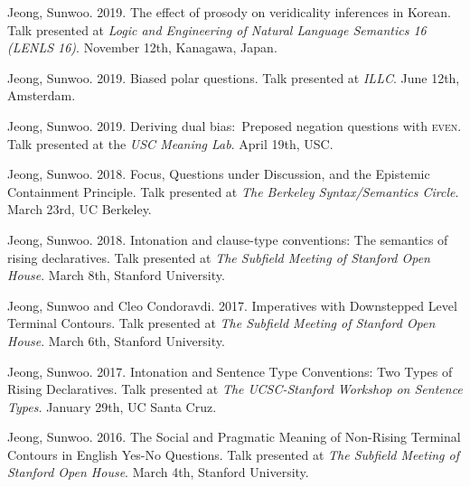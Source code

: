 \documentclass[letterpaper]{article}
\renewenvironment{itemize}{
  \begin{list}{}{
    \setlength{\leftmargin}{1.5em}
  }
}{
  \end{list}
}
\begin{document}
\begin{itemize}


\item Jeong, Sunwoo. 2019. The effect of prosody on veridicality inferences in Korean. Talk presented at \emph{Logic and Engineering of Natural Language Semantics 16 (LENLS 16)}. November 12th, Kanagawa, Japan.

\item Jeong, Sunwoo. 2019. Biased polar questions. Talk presented at \emph{ILLC}. June 12th, Amsterdam.

\item Jeong, Sunwoo. 2019. Deriving dual bias:\ Preposed negation questions with 
\textsc{even}. Talk presented at the \emph{USC Meaning Lab}. April 19th, USC.

\item Jeong, Sunwoo. 2018. Focus, Questions under Discussion, and the Epistemic Containment Principle. Talk presented at \emph{The Berkeley Syntax/Semantics Circle}. March 23rd, UC Berkeley.

\item Jeong, Sunwoo. 2018. Intonation and clause-type conventions: The semantics of rising declaratives. Talk presented at \emph{The Subfield Meeting of Stanford Open House}. March 8th, Stanford University.

\item Jeong, Sunwoo and Cleo Condoravdi. 2017. Imperatives with Downstepped Level Terminal Contours. Talk presented at \emph{The Subfield Meeting of Stanford Open House}. March 6th, Stanford University.

\item Jeong, Sunwoo. 2017. Intonation and Sentence Type Conventions: Two Types of Rising Declaratives. Talk presented at \emph{The UCSC-Stanford Workshop on Sentence Types.} January 29th, UC Santa Cruz.

\item Jeong, Sunwoo. 2016. The Social and Pragmatic Meaning of Non-Rising Terminal Contours in English Yes-No Questions. Talk presented at \emph{The Subfield Meeting of Stanford Open House}. March 4th, Stanford University.



\end{itemize}
\end{document}
